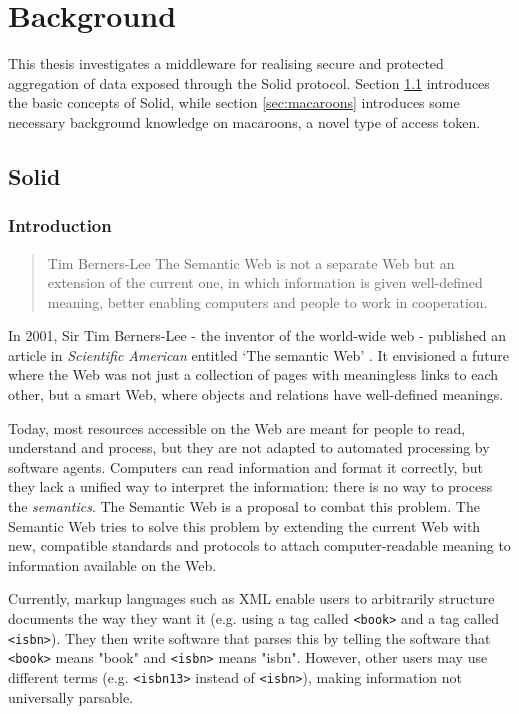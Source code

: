 \chapter{Background}
\label{cha:background}
This thesis investigates a middleware for realising secure and protected aggregation of data exposed through the Solid protocol. Section \ref{sec:solid} introduces the basic concepts of Solid, while section \ref{sec:macaroons} introduces some necessary background knowledge on macaroons, a novel type of access token.

\section{Solid}
\label{sec:solid}

\subsection{Introduction}
\begin{quote}{Tim Berners-Lee}
    The Semantic Web is not a separate Web but an extension of the current one, in which information is given well-defined meaning, better enabling computers and people to work in cooperation.
\end{quote}

\noindent In 2001, Sir Tim Berners-Lee - the inventor of the world-wide web - published an article in \textit{Scientific American} entitled `The semantic Web' \citep{semantic-web}. It envisioned a future where the Web was not just a collection of pages with meaningless links to each other, but a smart Web, where objects and relations have well-defined meanings.

Today, most resources accessible on the Web are meant for people to read, understand and process, but they are not adapted to automated processing by software agents. Computers can read information and format it correctly, but they lack a unified way to interpret the information: there is no way to process the \textit{semantics}. The Semantic Web is a proposal to combat this problem. The Semantic Web tries to solve this problem by extending the current Web with new, compatible standards and protocols to attach computer-readable meaning to information available on the Web.

Currently, markup languages such as XML enable users to arbitrarily structure documents the way they want it (e.g. using a tag called \texttt{<book>} and a tag called \texttt{<isbn>}). They then write software that parses this by telling the software that \texttt{<book>} means "book" and \texttt{<isbn>} means "isbn". However, other users may use different terms (e.g. \texttt{<isbn13>} instead of \texttt{<isbn>}), making information not universally parsable. 

